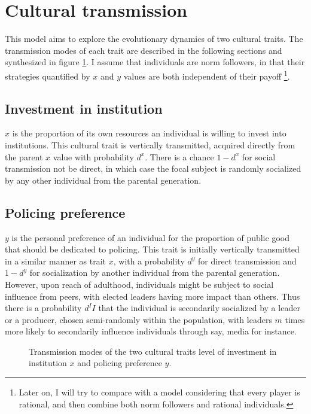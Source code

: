 \documentclass[a4paper]{article}
\begin{document}
\section{Cultural transmission}
\label{sec:trans}

This model aims to explore the evolutionary dynamics of two cultural traits. The transmission modes of each trait are described in the following sections and synthesized in figure \ref{fig:cultrans}. I assume that individuals are norm followers, in that their strategies quantified by $x$ and $y$ values are both independent of their payoff \footnote{Later on, I will try to compare with a model considering that every player is rational, and then combine both norm followers and rational individuals.}. 

\subsection{Investment in institution}

$x$ is the proportion of its own resources an individual is willing to invest into institutions. This cultural trait is vertically transmitted, acquired directly from the parent $x$ value with probability $d^x$. There is a chance $1-d^x$ for social transmission not be direct, in which case the focal subject is randomly socialized by any other individual from the parental generation.

\subsection{Policing preference}

$y$ is the personal preference of an individual for the proportion of public good that should be dedicated to policing. This trait is initially vertically transmitted in a similar manner as trait $x$, with a probability $d^y$ for direct transmission and $1-d^y$ for socialization by another individual from the parental generation. However, upon reach of adulthood, individuals might be subject to social influence from peers, with elected leaders having more impact than others. Thus there is a probability $d^II$ that the individual is secondarily socialized by a leader or a producer, chosen semi-randomly within the population, with leaders $m$ times more likely to secondarily influence individuals through say, media for instance.  

\begin{figure}[!htbp]
	\begin{center}
	\end{center}
	\caption{Transmission modes of the two cultural traits level of investment in institution $x$ and policing preference $y$.}
	\label{fig:cultrans}
\end{figure} 
\end{document}
